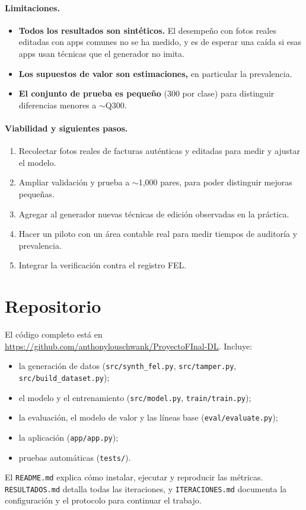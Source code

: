 \documentclass[11pt,letterpaper]{article}
\begin{document}
\paragraph{Limitaciones.}
\begin{itemize}
  \item \textbf{Todos los resultados son sintéticos.} El desempeño con fotos reales editadas con apps comunes no se ha medido, y es de esperar una caída si esas apps usan técnicas que el generador no imita.
  \item \textbf{Los supuestos de valor son estimaciones,} en particular la prevalencia.
  \item \textbf{El conjunto de prueba es pequeño} (300 por clase) para distinguir diferencias menores a ${\sim}$Q300.
\end{itemize}

\paragraph{Viabilidad y siguientes pasos.}
\begin{enumerate}
  \item Recolectar fotos reales de facturas auténticas y editadas para medir y ajustar el modelo.
  \item Ampliar validación y prueba a ${\sim}$1,000 pares, para poder distinguir mejoras pequeñas.
  \item Agregar al generador nuevas técnicas de edición observadas en la práctica.
  \item Hacer un piloto con un área contable real para medir tiempos de auditoría y prevalencia.
  \item Integrar la verificación contra el registro FEL.
\end{enumerate}

\section{Repositorio}

El código completo está en \url{https://github.com/anthonylouschwank/ProyectoFInal-DL}. Incluye:
\begin{itemize}
  \item la generación de datos (\texttt{src/synth\_fel.py}, \texttt{src/tamper.py}, \texttt{src/build\_dataset.py});
  \item el modelo y el entrenamiento (\texttt{src/model.py}, \texttt{train/train.py});
  \item la evaluación, el modelo de valor y las líneas base (\texttt{eval/evaluate.py});
  \item la aplicación (\texttt{app/app.py});
  \item pruebas automáticas (\texttt{tests/}).
\end{itemize}
El \texttt{README.md} explica cómo instalar, ejecutar y reproducir las métricas. \texttt{RESULTADOS.md} detalla todas las iteraciones, y \texttt{ITERACIONES.md} documenta la configuración y el protocolo para continuar el trabajo.
\end{document}
